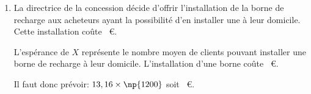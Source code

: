 \begin{enumerate}
\begin{enumerate}
		\item La directrice de la concession décide d'offrir l'installation de la borne de recharge aux acheteurs ayant la possibilité d'en installer une à leur domicile. Cette installation coûte ~\euro.
		

L'espérance de $X$ représente le nombre moyen de clients pouvant installer une borne de recharge à leur domicile. L'installation d'une borne coûte ~\euro.

Il faut donc prévoir: $13,16\times \np{1200}$ soit ~\euro.
	\end{enumerate}
\end{enumerate}

\bigskip

